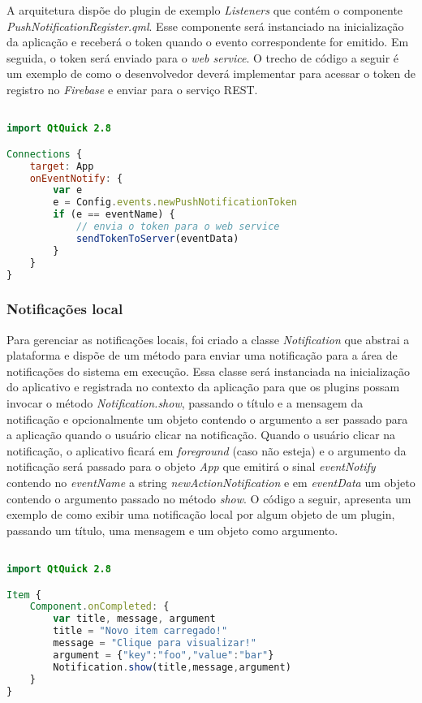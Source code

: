 A arquitetura dispõe do plugin de exemplo \textit{Listeners} que contém o componente \textit{PushNotificationRegister.qml}. Esse componente será instanciado na inicialização da aplicação e receberá o token quando o evento correspondente for emitido. Em seguida, o token será enviado para o \textit{web service}. O trecho de código a seguir é um exemplo de como o desenvolvedor deverá implementar para acessar o token de registro no \textit{Firebase} e enviar para o serviço REST.

\begin{center}
\begin{lstlisting}[language=qml]

import QtQuick 2.8

Connections {
    target: App
    onEventNotify: {
		var e
		e = Config.events.newPushNotificationToken
        if (e == eventName) {
            // envia o token para o web service
            sendTokenToServer(eventData)
        }
    }
}
\end{lstlisting}
\end{center}

\subsubsection{Notificações local}
Para gerenciar as notificações locais, foi criado a classe \textit{Notification} que abstrai a plataforma e dispõe de um método para enviar uma notificação para a área de notificações do sistema em execução. Essa classe será instanciada na inicialização do aplicativo e registrada no contexto da aplicação para que os plugins possam invocar o método \textit{Notification.show}, passando o título e a mensagem da notificação e opcionalmente um objeto contendo o argumento a ser passado para a aplicação quando o usuário clicar na notificação. Quando o usuário clicar na notificação, o aplicativo ficará em \textit{foreground} (caso não esteja) e o argumento da notificação será passado para o objeto \textit{App} que emitirá o sinal \textit{eventNotify} contendo no \textit{eventName} a string \textit{newActionNotification} e em \textit{eventData} um objeto contendo o argumento passado no método \textit{show}. O código a seguir, apresenta um exemplo de como exibir uma notificação local por algum objeto de um plugin, passando um título, uma mensagem e um objeto como argumento.

\begin{center}
\begin{lstlisting}[language=qml]

import QtQuick 2.8

Item {
    Component.onCompleted: {
		var title, message, argument
		title = "Novo item carregado!"
		message = "Clique para visualizar!"
		argument = {"key":"foo","value":"bar"}
		Notification.show(title,message,argument)
	}
}
\end{lstlisting}
\end{center}


